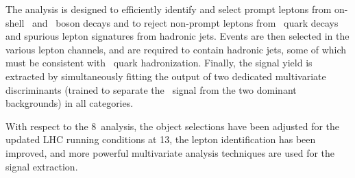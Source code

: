 The analysis is designed to efficiently identify and select prompt leptons from on-shell \PW\ and \Z\ boson decays and to reject non-prompt leptons from \cPqb\ quark decays and spurious lepton signatures from hadronic jets.
Events are then selected in the various lepton channels, and are required to contain hadronic jets, some of which must be consistent with \cPqb\ quark hadronization.
Finally, the signal yield is extracted by simultaneously fitting the output of two dedicated multivariate discriminants (trained to separate the \tHq\ signal from the two dominant backgrounds) in all categories.

With respect to the 8\TeV\ analysis, the object selections have been adjusted for the updated LHC running conditions at 13\TeV, the lepton identification has been improved, and more powerful multivariate analysis techniques are used for the signal extraction.

